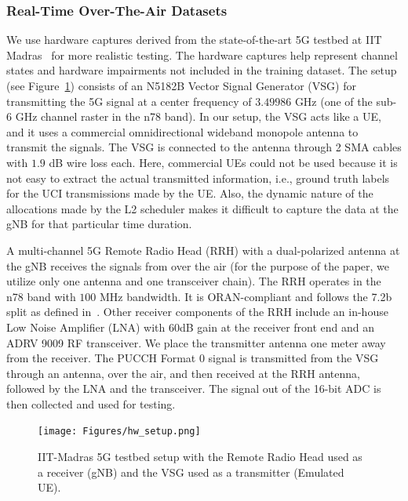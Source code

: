\documentclass[journal]{IEEEtran}
\begin{document}
\subsubsection{Real-Time Over-The-Air Datasets}
We use hardware captures derived from the state-of-the-art 5G testbed at IIT Madras~\cite{5gtbiitm} for more realistic testing. The hardware captures help represent channel states and hardware impairments not included in the training dataset. The setup (see Figure~\ref{fig: hw_setup}) consists of an N5182B Vector Signal Generator (VSG) for transmitting the  5G signal at a center frequency of $3.49986$ GHz (one of the sub-6 GHz channel raster in the n78 band). In our setup, the VSG acts like a UE, and it uses a commercial omnidirectional wideband monopole antenna to transmit the signals. The VSG is connected to the antenna through 2 SMA cables with $1.9$ dB wire loss each. Here, commercial UEs could not be used because it is not easy to extract the actual transmitted information, i.e., ground truth labels for the UCI transmissions made by the UE. Also, the dynamic nature of the allocations made by the L2 scheduler makes it difficult to capture the data at the gNB for that particular time duration.

A  multi-channel 5G Remote Radio Head (RRH) with a dual-polarized antenna at the gNB receives the signals from over the air (for the purpose of the paper, we utilize only one antenna and one transceiver chain). The RRH operates in the n78 band with $100$ MHz bandwidth. It is ORAN-compliant and follows the 7.2b split as defined in~\cite{ORAN_spec}. Other receiver components of the RRH include an in-house Low Noise Amplifier (LNA) with 60dB gain at the receiver front end and an ADRV 9009 RF transceiver. We place the transmitter antenna one meter away from the receiver. The PUCCH Format 0 signal is transmitted from the VSG through an antenna, over the air, and then received at the RRH antenna, followed by the LNA and the transceiver. The signal out of the 16-bit ADC is then collected and used for testing. 

\begin{figure}[h]
\centering
\texttt{[image: Figures/hw\_setup.png]}
\caption{IIT-Madras 5G testbed setup with the Remote Radio Head used as a receiver (gNB) and the VSG used as a transmitter (Emulated UE).}
\label{fig: hw_setup}
\end{figure}
\end{document}
